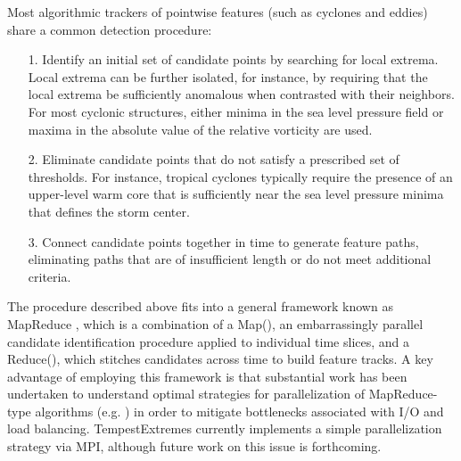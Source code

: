 \documentclass[gmdd, hvmath, online]{copernicus_discussions}
\begin{document}
Most algorithmic trackers of pointwise features (such as cyclones and eddies) share a common detection procedure:
\begin{itemize}
\item[1.] Identify an initial set of candidate points by searching for local extrema.  Local extrema can be further isolated, for instance, by requiring that the local extrema be sufficiently anomalous when contrasted with their neighbors.  For most cyclonic structures, either minima in the sea level pressure field or maxima in the absolute value of the relative vorticity are used.
\item[2.] Eliminate candidate points that do not satisfy a prescribed set of thresholds.  For instance, tropical cyclones typically require the presence of an upper-level warm core that is sufficiently near the sea level pressure minima that defines the storm center.
\item[3.] Connect candidate points together in time to generate feature paths, eliminating paths that are of insufficient length or do not meet additional criteria.
\end{itemize}  The procedure described above fits into a general framework known as MapReduce \citep{dean2008mapreduce}, which is a combination of a Map(), an embarrassingly parallel candidate identification procedure applied to individual time slices, and a Reduce(), which stitches candidates across time to build feature tracks.  A key advantage of employing this framework is that substantial work has been undertaken to understand optimal strategies for parallelization of MapReduce-type algorithms (e.g. \cite{Prabhat2012}) in order to mitigate bottlenecks associated with I/O and load balancing.  TempestExtremes currently implements a simple parallelization strategy via MPI, although future work on this issue is forthcoming.
\end{document}
